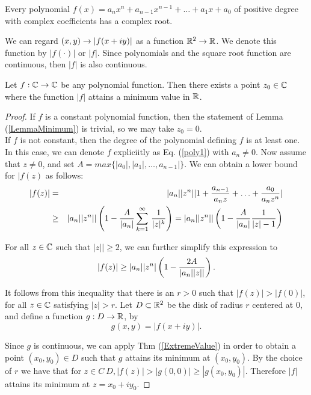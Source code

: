 \begin{theorem} Every polynomial $f(x) =  a_n x^n + a_{n-1}x^{n-1} + \hdots + a_1 x + a_0$ of positive degree with complex coefficients has a complex root. 
\label{Fundamental}
\end{theorem}

We can regard $(x, y) \rightarrow |f(x + iy)|$ as a function $\mathbb{R}^2 \rightarrow \mathbb{R}$.
We denote this function by $|f(\cdot)|$ or $|f|$. Since polynomials and the square root function are continuous, then $|f|$ is also continuous.\\

\begin{lemma}
Let $f : \mathbb{C} \rightarrow \mathbb{C}$ be any polynomial function. Then there exists a point $z_0 \in \mathbb{C}$ where the function $|f|$ attains a minimum value in $\mathbb{R}$. 
\label{LemmaMinimum}
\end{lemma}

\begin{proof}
If $f$ is a constant polynomial function, then the statement of Lemma (\ref{LemmaMinimum}) is trivial, so we may take $z_0 = 0$. \\
If $f$ is not constant, then the degree of the polynomial defining $f$ is at least one. In this case, we can denote $f$ expliciitly as Eq. (\ref{poly1}) with $a_n \ne 0$. Now assume that $z\ne 0$, and set $A = max\{ |a_0|, |a_1|, \hdots, a_{n-1}|\}$.
We can obtain a lower bound for $|f(z)$ as follows: 
\begin{eqnarray*}
| f(z) | &=& |a_n| |z^n| | 1 + { a_{n-1}\over a_n z} + \hdots + {a_0 \over a_n z^n} |\cr
&\ge& |a_n| |z^n| | \left( 1 - {A\over |a_n|} \sum_{k=1}^\infty \, {1\over |z|^k } \right) =   |a_n| |z^n| | \left( 1 - {A\over |a_n|} {1\over |z| - 1}\right)
\end{eqnarray*}

For all $z \in \mathbb{C}$ such that $|z|| \ge 2$, we can further simplify this expression to 
\[ |f(z)| \ge |a_n| |z^n| \left( 1 - {2A\over |a_n| |z|| } \right). \]

It follows from this inequality that there is an $ r > 0 $ such that $ |f(z)| >  |f(0)| $, 
for all $z\in \mathbb{C}$ satisfying $|z| > r$. Let $D \subset \mathbb{R}^2$ be the disk of radius $r$ centered at 0, and define a function $g : D \rightarrow \mathbb{R}$, by
\[ g(x,y) = |f(x+iy)|. \]

Since $g$ is continuous, we can apply Thm (\ref{ExtremeValue}) in order to obtain a point $(x_0, y_0) \in D$ such that $g$ attains its minimum at $(x_0, y_0)$. By the choice of $r$ we have that for $z\in C \ D, |f(z)| > |g(0,0)| \ge |g(x_0, y_0)|$. Therefore $|f|$ attains its minimum at $z = x_0 + i y_0$. 
\end{proof}

